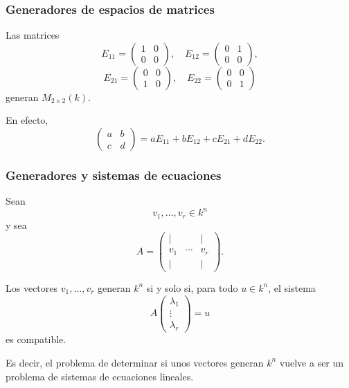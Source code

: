 \begin{frame}
    \frametitle{Generadores de espacios de matrices}

    \begin{example}
        Las matrices
        \[
            E_{11}=
            \begin{pmatrix}
                1&0\\
                0&0
            \end{pmatrix},
            \quad
            E_{12}=
            \begin{pmatrix}
                0&1\\
                0&0
            \end{pmatrix},
        \]
        \[
            E_{21}=
            \begin{pmatrix}
                0&0\\
                1&0
            \end{pmatrix},
            \quad
            E_{22}=
            \begin{pmatrix}
                0&0\\
                0&1
            \end{pmatrix}
        \]
        generan \(M_{2\times2}(k)\).

        En efecto,
        \[
            \begin{pmatrix}
                a&b\\
                c&d
            \end{pmatrix}
            =
            aE_{11}+bE_{12}+cE_{21}+dE_{22}.
        \]
    \end{example}
\end{frame}


\begin{frame}
    \frametitle{Generadores y sistemas de ecuaciones}

    Sean
    \[
        v_1,\ldots,v_r\in k^n
    \]
    y sea
    \[
        A=
        \begin{pmatrix}
            \vert & & \vert\\
            v_1 & \cdots & v_r\\
            \vert & & \vert
        \end{pmatrix}.
    \]

    Los vectores \(v_1,\ldots,v_r\) generan \(k^n\) si y solo si,
    para todo \(u\in k^n\), el sistema
    \[
        A
        \begin{pmatrix}
            \lambda_1\\
            \vdots\\
            \lambda_r
        \end{pmatrix}
        =u
    \]
    es compatible.

    \medskip

    Es decir, el problema de determinar si unos vectores generan \(k^n\)
    vuelve a ser un problema de sistemas de ecuaciones lineales.
\end{frame}


